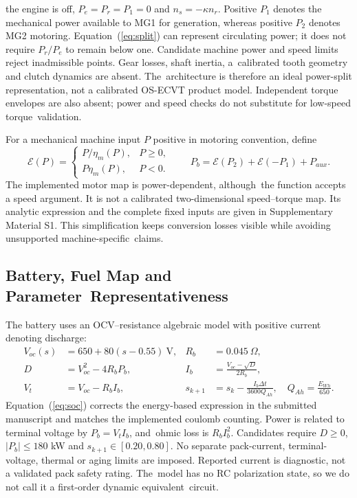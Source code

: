 \documentclass[energies,article,submit,moreauthors]{Definitions/mdpi}
\begin{document}
 the engine is off, $P_e=P_r=P_1=0$ and $n_s=-\kappa n_r$. Positive $P_1$ denotes the mechanical power available to MG1 for generation, whereas positive $P_2$ denotes MG2 motoring. Equation~(\ref{eq:split}) can represent circulating power; it does not require $P_r/P_e$ to remain below one. Candidate machine power and speed limits reject inadmissible points. Gear losses, shaft inertia, a~calibrated tooth geometry and clutch dynamics are absent. The~architecture is therefore an ideal power-split representation, not a calibrated OS-ECVT product model. Independent torque envelopes are also absent; power and speed checks do not substitute for low-speed torque~validation.

For a mechanical machine input $P$ positive in motoring convention, define
\begin{equation}
 \mathcal{E}(P)=\begin{cases}P/\eta_m(P),&P\geq0,\\P\eta_m(P),&P<0.\end{cases}
 \qquad P_b=\mathcal{E}(P_2)+\mathcal{E}(-P_1)+P_{aux}.
\end{equation}
The implemented motor map is power-dependent, although~the function accepts a speed argument. It is not a calibrated two-dimensional speed--torque map. Its analytic expression and the complete fixed inputs are given in Supplementary Material S1. This simplification keeps conversion losses visible while avoiding unsupported machine-specific~claims.

\subsection{Battery, Fuel Map and Parameter~Representativeness}
The battery uses an OCV--resistance algebraic model with positive current denoting discharge:
\begin{align}
 V_{oc}(s)&=650+80(s-0.55)\ \mathrm{V},&R_b&=0.045\ \Omega,\\
 D&=V_{oc}^2-4R_bP_b,& I_b&=\frac{V_{oc}-\sqrt{D}}{2R_b},\label{eq:battery}\\
 V_t&=V_{oc}-R_bI_b,&
 s_{k+1}&=s_k-\frac{I_b\Delta t}{3600Q_{Ah}},\quad Q_{Ah}=\frac{E_{Wh}}{650}.
 \label{eq:soc}
\end{align}
Equation~(\ref{eq:soc}) corrects the energy-based expression in the submitted manuscript and matches the implemented coulomb counting. Power is related to terminal voltage by $P_b=V_tI_b$, and~ohmic loss is $R_bI_b^2$. Candidates require $D\geq0$, $|P_b|\leq180$ kW and $s_{k+1}\in[0.20,0.80]$. No separate pack-current, terminal-voltage, thermal or aging limits are imposed. Reported current is diagnostic, not a validated pack safety rating. The~model has no RC polarization state, so we do not call it a first-order dynamic equivalent~circuit.
\end{document}
